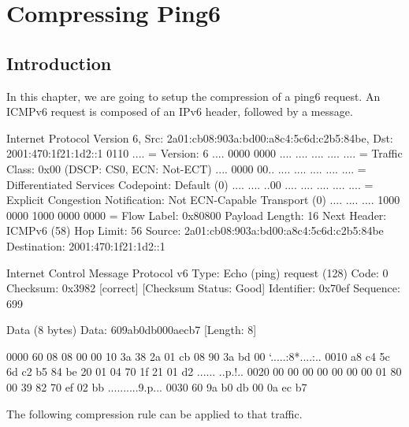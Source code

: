
\chapter{Compressing Ping6}

\section{Introduction}

In this chapter, we are going to setup the compression of a ping6 request. An ICMPv6 request is composed of an IPv6 header, followed by a  message.

\begin{termc}[backgroundcolor=\color{gray!10}, basicstyle=\ttfamily\tiny, escapechar=@]
Internet Protocol Version 6, Src: 2a01:cb08:903a:bd00:a8c4:5c6d:c2b5:84be, Dst: 
2001:470:1f21:1d2::1
    0110 .... = Version: 6
    .... 0000 0000 .... .... .... .... .... = Traffic Class: 0x00 (DSCP: CS0, ECN: Not-ECT)
        .... 0000 00.. .... .... .... .... .... = Differentiated Services Codepoint: Default (0)
        .... .... ..00 .... .... .... .... .... = Explicit Congestion Notification: Not ECN-Capable Transport (0)
    .... .... .... 1000 0000 1000 0000 0000 = Flow Label: 0x80800
    Payload Length: 16
    Next Header: ICMPv6 (58)
    Hop Limit: 56
    Source: 2a01:cb08:903a:bd00:a8c4:5c6d:c2b5:84be
    Destination: 2001:470:1f21:1d2::1
    
Internet Control Message Protocol v6
    Type: Echo (ping) request (128)
    Code: 0
    Checksum: 0x3982 [correct]
    [Checksum Status: Good]
    Identifier: 0x70ef
    Sequence: 699

    Data (8 bytes)
        Data: 609ab0db000aecb7
        [Length: 8]

0000  60 08 08 00 00 10 3a 38 2a 01 cb 08 90 3a bd 00   `.....:8*....:..
0010  a8 c4 5c 6d c2 b5 84 be 20 01 04 70 1f 21 01 d2   ..\m.... ..p.!..
0020  00 00 00 00 00 00 00 01 80 00 39 82 70 ef 02 bb   ..........9.p...
0030  60 9a b0 db 00 0a ec b7  
\end{termc}

The following compression rule can be applied to that traffic.

